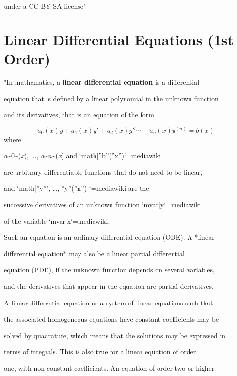     under a CC BY-SA license"

\section{Linear Differential Equations (1st Order)}
\label{sec:linear-differential-equations-1st-order}

"In mathematics, a \textbf{linear differential equation} is a differential

equation that is defined by a linear polynomial in the unknown function

and its derivatives, that is an equation of the form



$$a_0(x)y + a_1(x)y' + a_2(x)y'' \cdots + a_n(x)y^{(n)} = b(x)$$ where

\textit{a}\textasciitilde{}0\textasciitilde{}(\textit{x}), ..., \textit{a}\textasciitilde{}\textit{n}\textasciitilde{}(\textit{x}) and `{{math|''b''(''x'')}}`{=mediawiki}

are arbitrary differentiable functions that do not need to be linear,

and `{{math|''y''', …, ''y''(''n'') }}`{=mediawiki} are the

successive derivatives of an unknown function `{{mvar|y}}`{=mediawiki}

of the variable `{{mvar|x}}`{=mediawiki}.



Such an equation is an ordinary differential equation (ODE). A *linear

differential equation* may also be a linear partial differential

equation (PDE), if the unknown function depends on several variables,

and the derivatives that appear in the equation are partial derivatives.



A linear differential equation or a system of linear equations such that

the associated homogeneous equations have constant coefficients may be

solved by quadrature, which means that the solutions may be expressed in

terms of integrals. This is also true for a linear equation of order

one, with non-constant coefficients. An equation of order two or higher

